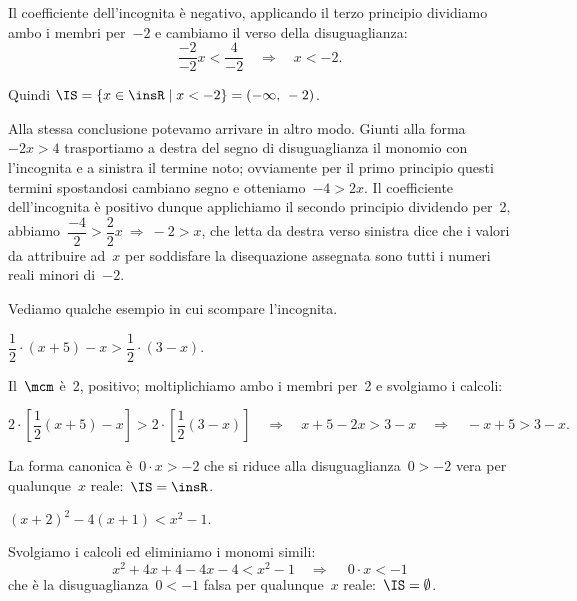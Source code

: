 \begin{exrig}
Il coefficiente dell'incognita è negativo, applicando
il terzo principio dividiamo ambo i membri per~$-2$ e cambiamo il verso
della disuguaglianza:
\[\frac{-2}{-2}x<\frac{4}{-2}\quad\Rightarrow\quad x<-2.\]

\begin{center}
 
\end{center}

 Quindi $\IS=\{x\in \insR\mid x<-2\}=(-\infty\text{,~}-2)$.


Alla stessa conclusione potevamo arrivare in altro modo. Giunti alla forma~$-2x>4$ trasportiamo a destra del
segno di disuguaglianza il monomio con l'incognita e a
sinistra il termine noto; ovviamente per il primo principio
questi termini spostandosi cambiano segno e otteniamo~$-4>2x$. Il coefficiente
dell'incognita è positivo dunque applichiamo il
secondo principio dividendo per~2,
abbiamo~$\dfrac{-4}{2}>\dfrac{2}{2}x\:\Rightarrow\: -2>x$, che letta da destra verso sinistra dice che i
valori da attribuire ad~$x$ per soddisfare la disequazione assegnata sono
tutti i numeri reali minori di~$-2$.

\vspace*{1.05ex}
\end{exrig}

Vediamo qualche esempio in cui scompare l'incognita.

\begin{exrig}

\begin{esempio}
$\dfrac{1}{2}\cdot (x+5)-x>\dfrac{1}{2}\cdot (3-x).$
\end{esempio}
Il~$\mcm$ è~2, positivo; moltiplichiamo ambo i membri per~2 e svolgiamo
i calcoli:

\[2\cdot \left[\frac{1}{2}(x+5)-x\right]>2\cdot
\left[\frac{1}{2}(3-x)\right]\quad\Rightarrow\quad x+5-2x>3-x\quad\Rightarrow\quad -x+5>3-x.\]

La forma canonica è~$0\cdot x>-2$ che si riduce alla disuguaglianza~$0>-2$
vera per qualunque~$x$ reale:~$\IS=\insR$.


\begin{esempio}
$(x+2)^2-4(x+1)<x^{2}-1.$
\end{esempio}
Svolgiamo i calcoli ed eliminiamo i monomi simili:
\[x^{2}+4x+4-4x-4<x^{2}-1\quad\Rightarrow\quad~0\cdot x<-1\]
che è la disuguaglianza~$0<-1$ falsa per qualunque~$x$ reale:~$\IS=\emptyset $.
\vspace*{1.05ex}
\end{exrig}

